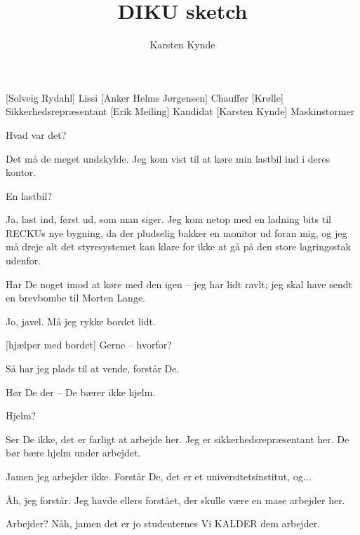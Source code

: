 \documentclass[a4paper,11pt]{article}
\title{DIKU sketch}
\author{Karsten Kynde}
\begin{document}
\maketitle

\begin{roles}
[Solveig Rydahl] Lissi
[Anker Helms Jørgensen] Chauffør
[Krølle] Sikkerhedsrepræsentant
[Erik Meiling] Kandidat
[Karsten Kynde] Maskinstormer
\end{roles}

\begin{sketch}


   Hvad var det?


   Det må de meget undskylde.  Jeg kom vist til at køre min
  lastbil ind i deres kontor.

   En lastbil?

   Ja, last ind, først ud, som man siger.  Jeg kom netop med
  en ladning bits til RECKUs nye bygning, da der pludselig bakker en
  monitor ud foran mig, og jeg må dreje alt det styresystemet kan
  klare for ikke at gå på den store lagringsstak udenfor.

   Har De noget imod at køre med den igen -- jeg har lidt
  ravlt; jeg skal have sendt en brevbombe til Morten Lange.

   Jo, javel.  Må jeg rykke bordet lidt.

  [hjælper med bordet] Gerne -- hvorfor?

   Så har jeg plads til at vende, forstår De. 

   Hør De der -- De bærer ikke hjelm.

   Hjelm?

   Ser De ikke, det er farligt at arbejde her.  Jeg er
  sikkerhedsrepræsentant her.  De bør bære hjelm under arbejdet.

   Jamen jeg arbejder ikke.  Forstår De, det er et
  universitetsinstitut, og...

   Åh, jeg forstår.  Jeg havde ellers forstået, der skulle
  være en mase arbejder her.

   Arbejder?  Nåh, jamen det er jo studenternes  Vi KALDER dem arbejder.


\end{sketch}
\end{document}
